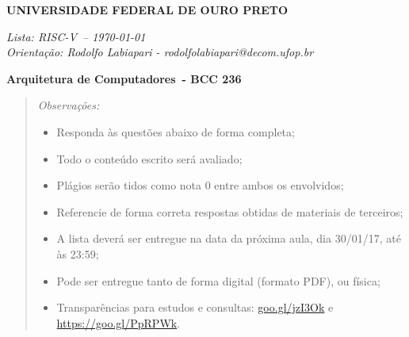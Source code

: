 \documentclass[a4paper,12pt,fleqn]{article}
\newcommand{\institution}{UNIVERSIDADE FEDERAL DE OURO PRETO}
\newcommand{\titlehd}{Arquitetura de Computadores}
\newcommand{\examtype}{Lista: RISC-V}
\newcommand{\examdate}{\today}
\newcommand{\examcode}{BCC 236}
\newcommand{\readtime}{Quinze Minutos}
\newcommand{\writetime}{Duas Horas}
\newcommand{\materials}{Nenhum Material Auxiliar é permitido}
\begin{document}

\begin{center}
\large\textbf{\institution}
\end{center}

\begin{center}
\textit{ \examtype\ -- \examdate \\ Orientação: Rodolfo Labiapari - rodolfolabiapari@decom.ufop.br}
\end{center}

\begin{center}
\large\textbf{\titlehd\ - \examcode}
\end{center}
\vspace{0.3cm}

\begin{comment}

\begin{center}
\textit{Reading Time: \readtime}
\end{center}
\begin{center}
\textit{Writing Time:  \writetime}
\end{center}
\begin{center}
\textit{Permitted Materials: \materials}
\end{center}
\end{comment}

\it

\begin{quote}
	\it
	Observações:
	
	\begin{itemize}
		\item Responda às questões abaixo de forma completa; 
		\item Todo o conteúdo escrito será avaliado;
		\item Plágios serão tidos como nota 0 entre ambos os envolvidos;
		\item Referencie de forma correta respostas obtidas de materiais de terceiros;
		\item A lista deverá ser entregue na data da próxima aula, dia 30/01/17, até às 23:59;
		\item Pode ser entregue tanto de forma digital (formato PDF), ou física;
		\item Transparências para estudos e consultas: \url{goo.gl/jzI3Ok} e \url{https://goo.gl/PpRPWk}. 
	\end{itemize}
	
\end{quote}
\end{document}
